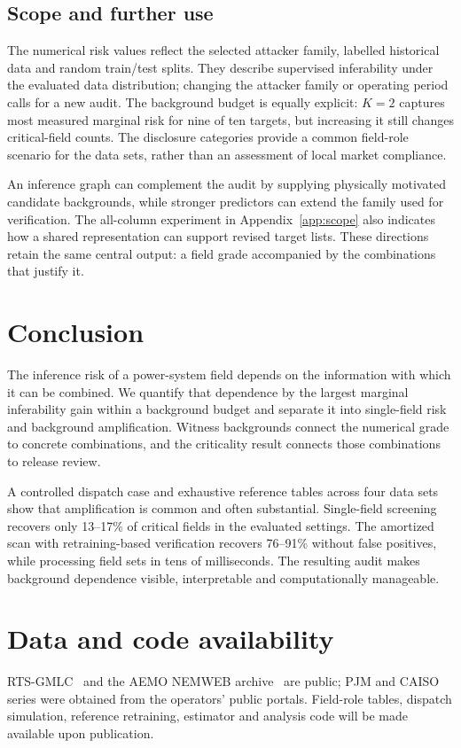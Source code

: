 \subsection{Scope and further use}
The numerical risk values reflect the selected attacker family, labelled historical data and random train/test splits. They describe supervised inferability under the evaluated data distribution; changing the attacker family or operating period calls for a new audit. The background budget is equally explicit: $K=2$ captures most measured marginal risk for nine of ten targets, but increasing it still changes critical-field counts. The disclosure categories provide a common field-role scenario for the data sets, rather than an assessment of local market compliance.

An inference graph can complement the audit by supplying physically motivated candidate backgrounds, while stronger predictors can extend the family used for verification. The all-column experiment in Appendix~\ref{app:scope} also indicates how a shared representation can support revised target lists. These directions retain the same central output: a field grade accompanied by the combinations that justify it.

\section{Conclusion}\label{sec:conclusion}
The inference risk of a power-system field depends on the information with which it can be combined. We quantify that dependence by the largest marginal inferability gain within a background budget and separate it into single-field risk and background amplification. Witness backgrounds connect the numerical grade to concrete combinations, and the criticality result connects those combinations to release review.

A controlled dispatch case and exhaustive reference tables across four data sets show that amplification is common and often substantial. Single-field screening recovers only 13--17\% of critical fields in the evaluated settings. The amortized scan with retraining-based verification recovers 76--91\% without false positives, while processing field sets in tens of milliseconds. The resulting audit makes background dependence visible, interpretable and computationally manageable.

\section*{Data and code availability}
RTS-GMLC~\cite{barrows2020rts} and the AEMO NEMWEB archive~\cite{aemo2024nemweb} are public; PJM and CAISO series were obtained from the operators' public portals. Field-role tables, dispatch simulation, reference retraining, estimator and analysis code will be made available upon publication.
